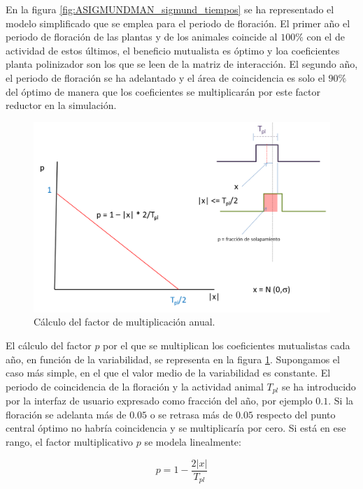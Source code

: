 En la figura \ref{fig:ASIGMUNDMAN_sigmund_tiempos} se ha representado el modelo simplificado que se emplea para el periodo de floración. El primer año el periodo de floración de las
plantas y de los animales coincide al $100\%$ con el de actividad de estos últimos, el beneficio mutualista es óptimo y loa coeficientes planta polinizador son los que se leen de la
matriz de interacción. El segundo año, el periodo de floración se ha adelantado y el área de coincidencia es solo el $90\%$ del óptimo de manera que los coeficientes se multiplicarán por este factor reductor en la simulación.

\begin{figure}[h!]
\centering
\includegraphics[scale=1]{ManFigs/sigmund_pendiente.png}
\caption{Cálculo del factor de multiplicación anual.}
\label{fig:ASIGMUNDMAN_sigmund_pendiente}
\end{figure}

El cálculo del factor $p$ por el que se multiplican los coeficientes mutualistas cada año, en función de la variabilidad, se representa en la figura \ref{fig:ASIGMUNDMAN_sigmund_pendiente}. Supongamos el caso más simple, en el que el valor medio de la variabilidad es constante. El periodo de coincidencia de la floración y la actividad animal $T_{pl}$ se ha introducido por la interfaz de usuario expresado como fracción del año, por ejemplo $0.1$. Si la floración se adelanta más de $0.05$ o se retrasa más de $0.05$ respecto del punto central óptimo no habría coincidencia y se multiplicaría por cero. Si está en ese rango, el factor multiplicativo $p$ se modela linealmente:

\begin{equation}
p = 1 - \frac{2|x|}{T_{pl}}
\label{eq:sigmund_p}
\end{equation}


